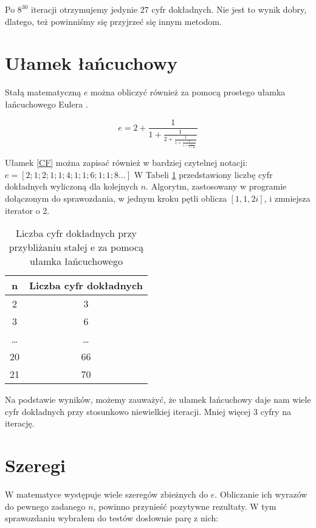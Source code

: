 \documentclass{article}
\begin{document}
Po $8^{30}$ iteracji otrzymujemy jedynie $27$ cyfr dokładnych. Nie jest to wynik dobry, dlatego, też powinniśmy się przyjrzeć się innym metodom.

\section{Ułamek łańcuchowy}
Stałą matematyczną $e$ można  obliczyć również za pomocą prostego ułamka łańcuchowego Eulera \cite{CF}.

\begin{equation}\label{CF}
e = 2 + \frac{1}{1+\frac{1}{2+\frac{1}{1+\frac{1}{1+\frac{1}{4+\frac{1}{\dots}}}}}}
\end{equation}

Ułamek \eqref{CF} można zapisać również w bardziej czytelnej notacji:  $e = [2;1;2;1;1;4;1;1;6;1;1;8...]$
W Tabeli \ref{res,cf} przedstawiony liczbę cyfr dokładnych wyliczoną dla kolejnych $n$. Algorytm, zastosowany w programie dołączonym do sprawozdania, w jednym kroku pętli oblicza $[1,1,2i]$, i zmniejsza iterator o $2$. 

\begin{table}[h] 
	\centering 
	\begin{tabular}{|c|c|}
		\hline
		n & Liczba cyfr dokładnych \\ \hline
		2 & 3 \\ 
		3 & 6 \\
		\dots & \dots \\
		20 & 66\\
		21 & 70\\
		\hline 
	\end{tabular}
	\caption{Liczba cyfr dokładnych przy przybliżaniu stałej e za pomocą ułamka łańcuchowego}
	\label{res,cf}
\end{table}

Na podstawie wyników, możemy zauważyć, że ułamek łańcuchowy daje nam wiele cyfr dokładnych przy stosunkowo niewielkiej iteracji. Mniej więcej $3$ cyfry na iterację.

\section{Szeregi}

W matematyce występuje wiele szeregów zbieżnych do $e$. Obliczanie ich wyrazów do pewnego zadanego $n$, powinno przynieść pozytywne rezultaty. W tym sprawozdaniu wybrałem do testów dosłownie parę z nich: \cite{SZE}
\end{document}
